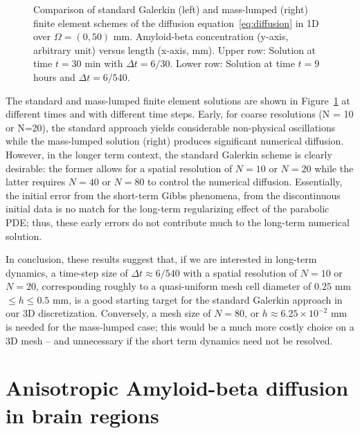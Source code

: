 \begin{figure}
{%
  Comparison of standard Galerkin (left) and mass-lumped (right)
  finite element schemes of the diffusion
  equation~\eqref{eq:diffusion} in 1D over $\Omega = (0, 50)$
  mm. Amyloid-beta concentration (y-axis, arbitrary unit) versus
  length (x-axis, mm). Upper row: Solution at time $t = 30$ min with
  $\Delta t = 6/30$. Lower row: Solution at time $t = 9$ hours and
  $\Delta t = 6/540$.}
\label{fig:chp6:numerics}
\end{figure}

The standard and mass-lumped finite element solutions are shown in
Figure~\ref{fig:chp6:numerics} at different times and with different
time steps. Early, for coarse resolutions (N = 10 or N=20), the
standard approach yields considerable non-physical oscillations while
the mass-lumped solution (right) produces significant numerical
diffusion. However, in the longer term context, the standard Galerkin
scheme is clearly desirable: the former allows for a spatial
resolution of $N=10$ or $N=20$ while the latter requires $N=40$ or
$N=80$ to control the numerical diffusion. Essentially, the initial
error from the short-term Gibbs phenomena, from the discontinuous
initial data is no match for the long-term regularizing effect of the
parabolic PDE; thus, these early errors do not contribute much to the
long-term numerical solution.

In conclusion, these results suggest that, if we are interested in
long-term dynamics, a time-step size of $\Delta t \approx 6/540$ with
a spatial resolution of $N=10$ or $N=20$, corresponding roughly to a
quasi-uniform mesh cell diameter of $0.25$ mm $\leq h \leq 0.5$ mm, is
a good starting target for the standard Galerkin approach in our 3D
discretization. Conversely, a mesh size of $N = 80$, or $ h \approx
6.25\times 10^{-2}$ mm is needed for the mass-lumped case; this would
be a much more costly choice on a 3D mesh -- and unnecessary if the
short term dynamics need not be resolved.

\section{Anisotropic Amyloid-beta diffusion in brain regions}




